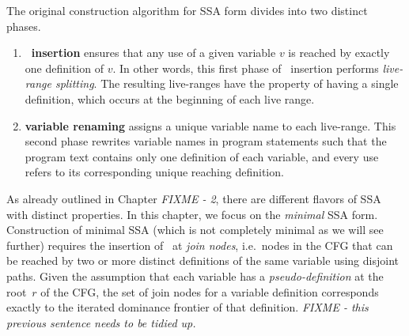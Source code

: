 The original construction algorithm for SSA form \cite{cytron91efficiently}
divides into two distinct phases.
\begin{enumerate}
\item \textbf{\phiop\ insertion} ensures that any use of a given variable $v$ is reached 
by exactly one definition of $v$. In other words, this first phase of \phiop\ insertion performs \textit{live-range splitting}.
The resulting live-ranges have the property of having a single definition, which occurs at the beginning of each live range.
\item \textbf{variable renaming} assigns a unique variable name to each live-range. This second phase rewrites variable names in program statements such that the program text contains only one definition of each variable, and every use refers to its corresponding unique reaching definition.
\end{enumerate}

As already outlined in Chapter \emph{FIXME - 2}, there are different flavors of SSA with distinct properties. In this chapter, we focus on the \textit{minimal} SSA form. Construction of minimal SSA 
(which is not completely minimal as we will see further) 
requires the insertion of \phiops\ at \textit{join nodes},
i.e.\ nodes in the CFG that can be reached by two or more distinct definitions of the same variable using disjoint paths. 
Given the assumption that each variable has a {\em pseudo-definition} at the root~$r$ of the CFG, the set of join nodes for a variable definition corresponds exactly to the iterated dominance frontier of that definition.
\emph{FIXME - this previous sentence needs to be tidied up.}


